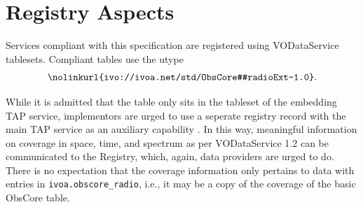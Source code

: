 \documentclass[11pt,a4paper]{ivoa}
\begin{document}
%
%
%
%
%

\section{Registry Aspects}
\label{sec:registry}

Services compliant with this specification are registered using
VODataService \citep{2021ivoa.spec.1102D} tablesets. Compliant tables
use the utype
$$
\hbox{\nolinkurl{ivo://ivoa.net/std/ObsCore#radioExt-1.0}.}
$$

While it is admitted that the table only sits in the tableset of the
embedding TAP service, implementors are urged to use a seperate registry
record with the main TAP service as an auxiliary capability
\citep{2019ivoa.spec.0520D}. In this way, meaningful information
on coverage in space, time, and spectrum as per VODataService 1.2 can
be communicated to the Registry, which, again, data providers are urged
to do. There is no expectation that the coverage information only
pertains to data with entries in \verb|ivoa.obscore_radio|, i.e., it may be
a copy of the coverage of the basic ObsCore table.
\end{document}
